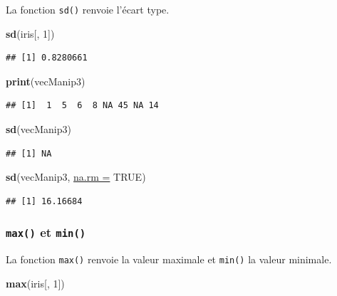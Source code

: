 \documentclass[twoside,symmetric]{book}
\newenvironment{Shaded}{}{}
\newcommand{\DataTypeTok}[1]{\underline{#1}}
\newcommand{\DecValTok}[1]{#1}
\newcommand{\KeywordTok}[1]{\textbf{#1}}
\newcommand{\NormalTok}[1]{#1}
\newcommand{\OtherTok}[1]{#1}
\begin{document}
La fonction \texttt{sd()} renvoie l'écart type.

\begin{Shaded}
\begin{Highlighting}[]
\KeywordTok{sd}\NormalTok{(iris[, }\DecValTok{1}\NormalTok{])}
\end{Highlighting}
\end{Shaded}

\begin{verbatim}
## [1] 0.8280661
\end{verbatim}

\begin{Shaded}
\begin{Highlighting}[]
\KeywordTok{print}\NormalTok{(vecManip3)}
\end{Highlighting}
\end{Shaded}

\begin{verbatim}
## [1]  1  5  6  8 NA 45 NA 14
\end{verbatim}

\begin{Shaded}
\begin{Highlighting}[]
\KeywordTok{sd}\NormalTok{(vecManip3)}
\end{Highlighting}
\end{Shaded}

\begin{verbatim}
## [1] NA
\end{verbatim}

\begin{Shaded}
\begin{Highlighting}[]
\KeywordTok{sd}\NormalTok{(vecManip3, }\DataTypeTok{na.rm =} \OtherTok{TRUE}\NormalTok{)}
\end{Highlighting}
\end{Shaded}

\begin{verbatim}
## [1] 16.16684
\end{verbatim}

\hypertarget{l015max}{%
\subsubsection{\texorpdfstring{\texttt{max()} et \texttt{min()}}{max() et min()}}\label{l015max}}

La fonction \texttt{max()} renvoie la valeur maximale et \texttt{min()} la valeur minimale.

\begin{Shaded}
\begin{Highlighting}[]
\KeywordTok{max}\NormalTok{(iris[, }\DecValTok{1}\NormalTok{])}
\end{Highlighting}
\end{Shaded}
\end{document}
